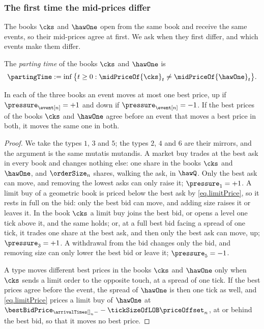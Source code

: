 \subsubsection{The first time the mid-prices differ}
\label{sec.partingTime}

The books $\cks$ and $\hawOne$ open from the same book and receive the same events,
so their mid-prices agree at first.
We ask when they first differ,
and which events make them differ.

\begin{defi}\label{def.partingTime}
 The \emph{parting time} of the books $\cks$ and $\hawOne$ is
 \begin{equation*}
  \partingTime := \inf \big\lbrace t \geq 0 :
  \midPriceOf{\cks}_t \neq \midPriceOf{\hawOne}_t \big\rbrace .
 \end{equation*}
\end{defi}

\begin{lemma}\label{lemma.oneBestPrice}
 In each of the three books an event moves at most one best price,
 up if $\pressure_{\event[n]} = +1$ and down if $\pressure_{\event[n]} = -1$.
 If the best prices of the books $\cks$ and $\hawOne$ agree before an event
 that moves a best price in both,
 it moves the same one in both.
\end{lemma}
\begin{proof}
 We take the types $1$, $3$ and $5$;
 the types $2$, $4$ and $6$ are their mirrors,
 and the argument is the same mutatis mutandis.
 A market buy trades at the best ask in every book and changes nothing else:
 one share in the books $\cks$ and $\hawOne$,
 and $\orderSize_n$ shares, walking the ask, in $\hawQ$.
 Only the best ask can move,
 and removing the lowest asks can only raise it;
 $\pressure_1 = +1$.
 A limit buy of a geometric book is priced below the best ask by \eqref{eq.limitPrice},
 so it rests in full on the bid:
 only the best bid can move,
 and adding size raises it or leaves it.
 In the book $\cks$ a limit buy joins the best bid, or opens a level one tick above it,
 and the same holds;
 or, at a full best bid facing a spread of one tick,
 it trades one share at the best ask,
 and then only the best ask can move, up;
 $\pressure_3 = +1$.
 A withdrawal from the bid changes only the bid,
 and removing size can only lower the best bid or leave it;
 $\pressure_5 = -1$.

 A type moves different best prices in the books $\cks$ and $\hawOne$
 only when $\cks$ sends a limit order to the opposite touch,
 at a spread of one tick.
 If the best prices agree before the event,
 the spread of $\hawOne$ is then one tick as well,
 and \eqref{eq.limitPrice} prices a limit buy of $\hawOne$ at
 $\bestBidPrice_{\arrivalTimes[]_n-} - \tickSizeOfLOB\priceOffset_n$,
 at or behind the best bid,
 so that it moves no best price.
\end{proof}

